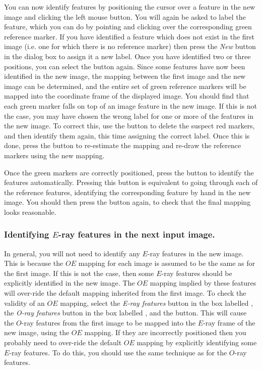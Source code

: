 You can now identify features by positioning the cursor over a feature in
the new image and clicking the left mouse button. You will again be asked
to label the feature, which you can do by pointing and clicking over the
corresponding green reference marker. If you have identified a feature
which does not exist in the first image (i.e. one for which there is no
reference marker) then press the {\em New} button in the  dialog box to assign it a new
label. Once you have identified two or three positions, you can select
the  button again. Since
some features have now been identified in the new image, the mapping
between the first image and the new image can be determined, and the
entire set of green reference markers will be mapped into the coordinate
frame of the displayed image. You should find that each green marker
falls on top of an image feature in the new image. If this is not the
case, you may have chosen the wrong label for one or more of the 
features in the new image. To correct this, use the  button to delete the suspect red markers, and
then identify them again, this time assigning the correct label. Once
this is done, press the  button to
re-estimate the mapping and re-draw the reference markers using the new
mapping.

Once the green markers are correctly positioned, press the
 button to identify the features
automatically. Pressing this button is equivalent to going
through each of the reference features, identifying the corresponding
feature by hand in the new image. You should then press the  button again, to check that the final mapping
looks reasonable.

\subsubsection {Identifying $E$-ray features in the next input image.}
In general, you will not need to identify any $E$-ray features in the new
image. This is because the $OE$ mapping for each image is assumed to be
the same as for the first image. If this is not the case, then some
$E$-ray features should be explicitly identified in the new image. The
$OE$ mapping implied by these features will over-ride the default mapping
inherited from the first image. To check the validity of an $OE$
mapping, select the {\em E-ray features} button in the box labelled
, the {\em O-ray features} button in
the box labelled , and the 
 button. This will cause
the $O$-ray features from the first image to be mapped into the $E$-ray
frame of the new image, using the $OE$ mapping. If they are incorrectly
positioned then you probably need to over-ride the default $OE$ mapping
by explicitly identifying some $E$-ray features. To do this, you should
use the same technique as for the $O$-ray features.


